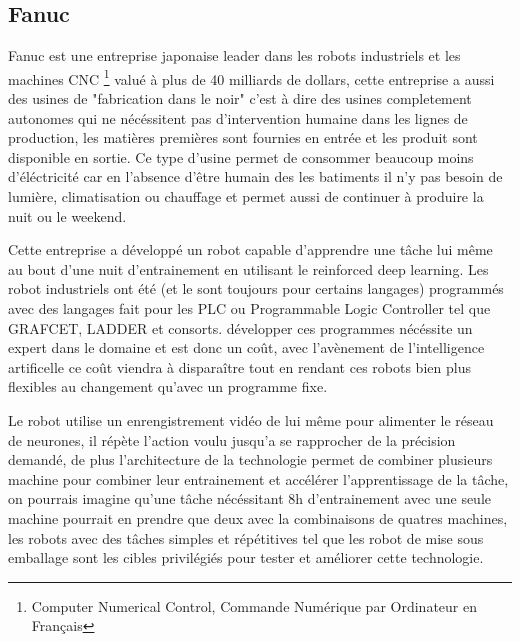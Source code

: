         \subsection*{Fanuc}
            Fanuc est une entreprise japonaise leader dans les robots industriels et les machines CNC 
            \footnote{Computer Numerical Control, Commande Numérique par Ordinateur en Français}
            valué à plus de 40 milliards de dollars, cette entreprise a aussi des usines de "fabrication dans le noir"
            c'est à dire des usines completement autonomes qui ne nécéssitent pas d'intervention humaine dans les 
            lignes de production, les matières premières sont fournies en entrée et les produit sont 
            disponible en sortie. Ce type d'usine permet de consommer beaucoup moins d'éléctricité car en l'absence 
            d'être humain des les batiments il n'y pas besoin de lumière, climatisation ou chauffage et permet
            aussi de continuer à produire la nuit ou le weekend. \newline

            Cette entreprise a développé un robot capable d'apprendre une tâche lui même au bout 
            d'une nuit d'entrainement en utilisant le reinforced deep learning. Les robot industriels 
            ont été (et le sont toujours pour certains langages) programmés avec des langages fait pour les PLC 
            ou Programmable Logic Controller tel que GRAFCET, LADDER et consorts. 
            développer ces programmes nécéssite un expert dans le domaine et est donc un coût, 
            avec l'avènement de l'intelligence artificelle ce coût viendra à disparaître tout 
            en rendant ces robots bien plus flexibles au changement qu'avec un programme fixe. \newline

            Le robot utilise un enrengistrement vidéo de lui même pour alimenter le réseau de neurones,
            il répète l'action voulu jusqu'a se rapprocher de la précision demandé,
            de plus l'architecture de la technologie permet de combiner plusieurs machine pour combiner 
            leur entrainement et accélérer l'apprentissage de la tâche, on pourrais imagine qu'une tâche 
            nécéssitant 8h d'entrainement avec une seule machine pourrait en prendre que deux 
            avec la combinaisons de quatres machines, les robots avec des tâches simples et répétitives 
            tel que les robot de mise sous emballage sont les cibles privilégiés pour tester et 
            améliorer cette technologie. \newline 

